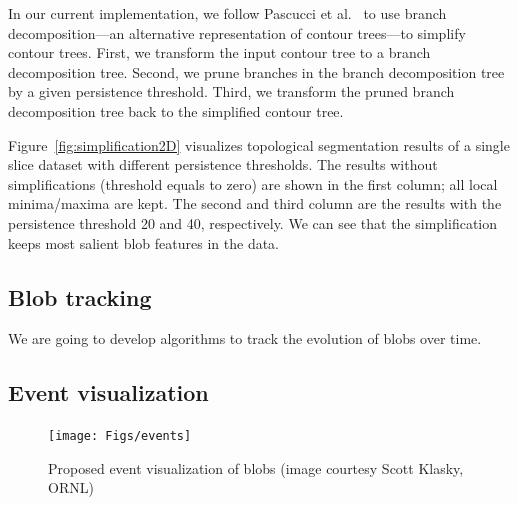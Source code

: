 In our current implementation, we follow Pascucci et al.~\cite{Pascucci2004} to use branch decomposition---an alternative representation of contour trees---to simplify contour trees.  First, we transform the input contour tree to a branch decomposition tree.  Second, we prune branches in the branch decomposition tree by a given persistence threshold.  Third, we transform the pruned branch decomposition tree back to the simplified contour tree.  

Figure~\ref{fig:simplification2D} visualizes topological segmentation results of a single slice dataset with different persistence thresholds.  The results without simplifications (threshold equals to zero) are shown in the first column; all local minima/maxima are kept.  The second and third column are the results with the persistence threshold 20 and 40, respectively.  We can see that the simplification keeps most salient blob features in the data.  




\subsection{Blob tracking}

We are going to develop algorithms to track the evolution of blobs over time.  


\subsection{Event visualization}

\begin{figure}[!h]
  \centering
  \texttt{[image: Figs/events]}
  \caption{Proposed event visualization of blobs (image courtesy Scott Klasky, ORNL)}
  \label{fig:events}
\end{figure}

